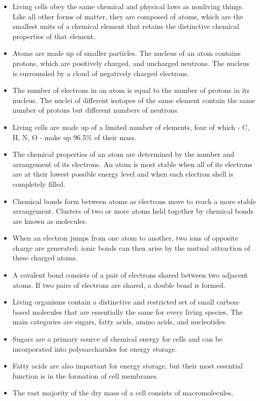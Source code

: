 \begin{itemize}
\item Living cells obey the same chemical and physical laws as nonliving
things. Like all other forms of matter, they are composed of atoms,
which are the smallest units of a chemical element that retains the
distinctive chemical properties of that element.
\item Atoms are made up of smaller particles. The nucleus of an atom
contains protons, which are positively charged, and uncharged neutrons. 
The nucleus is surrounded by a cloud of negatively charged
electrons.
\item The number of electrons in an atom is equal to the number of protons 
in its nucleus. The nuclei of different isotopes of the same
element contain the same number of protons but different numbers
of neutrons.
\item Living cells are made up of a limited number of elements, four of
which - C, H, N, O - make up 96.5\% of their mass.
\item The chemical properties of an atom are determined by the number
and arrangement of its electrons. An atom is most stable when all of
its electrons are at their lowest possible energy level and when each
electron shell is completely filled.
\item Chemical bonds form between atoms as electrons move to reach
a more stable arrangement. Clusters of two or more atoms held
together by chemical bonds are known as molecules.
\item When an electron jumps from one atom to another, two ions of opposite 
charge are generated; ionic bonds can then arise by the mutual
attraction of these charged atoms.
\item A covalent bond consists of a pair of electrons shared between two
adjacent atoms. If two pairs of electrons are shared, a double bond is
formed.
\item Living organisms contain a distinctive and restricted set of small carbon-based 
molecules that are essentially the same for every living
species. The main categories are sugars, fatty acids, amino acids,
and nucleotides.
\item Sugars are a primary source of chemical energy for cells and can be
incorporated into polysaccharides for energy storage.
\item Fatty acids are also important for energy storage, but their most
essential function is in the formation of cell membranes.
\item The vast majority of the dry mass of a cell consists of macromolecules, 

\end{itemize}
